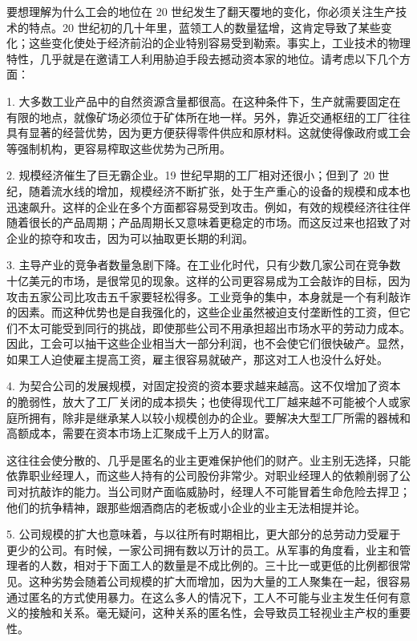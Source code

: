 要想理解为什么工会的地位在 20 世纪发生了翻天覆地的变化，你必须关注生产技术的特点。20 世纪初的几十年里，蓝领工人的数量猛增，这肯定导致了某些变化；这些变化使处于经济前沿的企业特别容易受到勒索。事实上，工业技术的物理特性，几乎就是在邀请工人利用胁迫手段去撼动资本家的地位。请考虑以下几个方面：

1. 大多数工业产品中的自然资源含量都很高。在这种条件下，生产就需要固定在有限的地点，就像矿场必须位于矿体所在地一样。另外，靠近交通枢纽的工厂往往具有显著的经营优势，因为更方便获得零件供应和原材料。这就使得像政府或工会等强制机构，更容易榨取这些优势为己所用。

2. 规模经济催生了巨无霸企业。19 世纪早期的工厂相对还很小；但到了 20 世纪，随着流水线的增加，规模经济不断扩张，处于生产重心的设备的规模和成本也迅速飙升。这样的企业在多个方面都容易受到攻击。例如，有效的规模经济往往伴随着很长的产品周期；产品周期长又意味着更稳定的市场。而这反过来也招致了对企业的掠夺和攻击，因为可以抽取更长期的利润。

3. 主导产业的竞争者数量急剧下降。在工业化时代，只有少数几家公司在竞争数十亿美元的市场，是很常见的现象。这样的公司更容易成为工会敲诈的目标，因为攻击五家公司比攻击五千家要轻松得多。工业竞争的集中，本身就是一个有利敲诈的因素。而这种优势也是自我强化的，这些企业虽然被迫支付垄断性的工资，但它们不太可能受到同行的挑战，即使那些公司不用承担超出市场水平的劳动力成本。因此，工会可以抽干这些企业相当大一部分利润，也不会使它们很快破产。显然，如果工人迫使雇主提高工资，雇主很容易就破产，那这对工人也没什么好处。

4. 为契合公司的发展规模，对固定投资的资本要求越来越高。这不仅增加了资本的脆弱性，放大了工厂关闭的成本损失；也使得现代工厂越来越不可能被个人或家庭所拥有，除非是继承某人以较小规模创办的企业。要解决大型工厂所需的器械和高额成本，需要在资本市场上汇聚成千上万人的财富。

这往往会使分散的、几乎是匿名的业主更难保护他们的财产。业主别无选择，只能依靠职业经理人，而这些人持有的公司股份非常少。对职业经理人的依赖削弱了公司对抗敲诈的能力。当公司财产面临威胁时，经理人不可能冒着生命危险去捍卫；他们的抗争精神，跟那些烟酒商店的老板或小企业的业主无法相提并论。

5. 公司规模的扩大也意味着，与以往所有时期相比，更大部分的总劳动力受雇于更少的公司。有时候，一家公司拥有数以万计的员工。从军事的角度看，业主和管理者的人数，相对于下面工人的数量是不成比例的。三十比一或更低的比例都很常见。这种劣势会随着公司规模的扩大而增加，因为大量的工人聚集在一起，很容易通过匿名的方式使用暴力。在这么多人的情况下，工人不可能与业主发生任何有意义的接触和关系。毫无疑问，这种关系的匿名性，会导致员工轻视业主产权的重要性。

